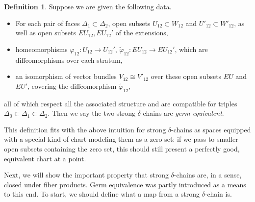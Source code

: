 \documentclass{memo-l}
\theoremstyle{definition}
\newtheorem{definition}[theorem]{Definition}
\theoremstyle{remark}
\numberwithin{section}{chapter}
\numberwithin{equation}{chapter}
\begin{document}
\begin{definition}Suppose we are given the following data. 
\begin{itemize}
\item For each pair of faces $\Delta_1 \subset \Delta_2$, open subsets $U_{12} \subset W_{12}$ and $U'_{12} \subset W'_{12}$, as well as open subsets $EU_{12}, EU_{12}'$ of the extensions, 
\item homeomorphisms $\varphi_{12}: U_{12} \to U_{12}'$, $\tilde \varphi_{12}: EU_{12} \to EU_{12}'$, which are diffeomorphisms over each stratum, 
\item an isomorphism of vector bundles $V_{12} \cong V'_{12}$ over these open subsets $EU$ and $EU'$, covering the diffeomorphism $\tilde \varphi_{12}$,
\end{itemize} 
all of which respect all the associated structure and are compatible for triples $\Delta_0 \subset \Delta_1 \subset \Delta_2$. Then we say the two strong $\delta$-chains are \emph{germ equivalent}.

\end{definition}

This definition fits with the above intuition for strong $\delta$-chains as spaces equipped with a special kind of chart modeling them as a zero set: if we pass to smaller open subsets containing the zero set, this should still present a perfectly good, equivalent chart at a point. 

Next, we will show the important property that strong $\delta$-chains are, in a sense, closed under fiber products. Germ equivalence was partly introduced as a means to this end. To start, we should define what a map from a strong $\delta$-chain is. 
\end{document}
